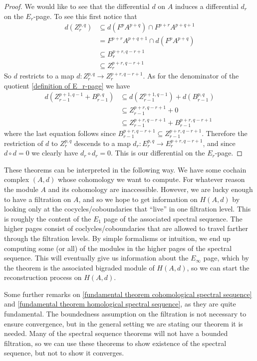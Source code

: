 \begin{proof}
We would like to see that the differential $d$ on $A$ induces a differential $d_r$ on the $E_r$-page. To see this first notice that
\begin{align*}
	d(Z_r^{p,q}) &\subseteq d(F^p A^{p+q}) \cap F^{p+r} A^{p+q+1} \\
						   &= F^{p+r} A^{p+q+1} \cap d(F^p A^{p+q}) \\
						   &\subseteq B_r^{p+r,q-r+1} \\
						   &\subseteq Z_r^{p+r,q-r+1} 
\end{align*}
So $d$ restricts to a map $d : Z_r^{p,q} \rightarrow Z_r^{p+r,q-r+1}$. As for the denominator of the quotient \ref{definition of E_r-page} we have
\begin{align*}
	d(Z_{r-1}^{p+1,q-1} + B_{r-1}^{p,q}) &\subseteq d(Z_{r-1}^{p+1,q-1}) + d(B_{r-1}^{p,q}) \\
	                                     &\subseteq Z_{r-1}^{p+r,q-r+1} + 0 \\
	                                     &\subseteq Z_{r-1}^{p+r,q-r+1} + B_{r-1}^{p+r,q-r+1}
\end{align*}
where the last equation follows since $B_{r-1}^{p+r,q-r+1} \subseteq Z_{r-1}^{p+r,q-r+1}$. Therefore the restriction of $d$ to $Z_r^{p,q}$ descends to a map $d_r : E_r^{p,q} \rightarrow E_r^{p+r,q-r+1}$, and since $d \circ d = 0$ we clearly have $d_r \circ d_r = 0$. This is our differential on the $E_r$-page.

\end{proof}

These theorems can be interpreted in the following way. We have some cochain complex $(A,d)$ whose cohomology we want to compute. For whatever reason the module $A$ and its cohomology are inaccessible. However, we are lucky enough to have a filtration on $A$, and so we hope to get information on $H(A,d)$ by looking only at the cocycles/coboundaries that ``live'' in one filtration level. This is roughly the content of the $E_1$ page of the associated spectral sequence. The higher pages consist of coclycles/coboundaries that are allowed to travel farther through the filtration levels. By simple formalisms or intuition, we end up computing some (or all) of the modules in the higher pages of the spectral sequence. This will eventually give us information about the $E_\infty$ page, which by the theorem is the associated bigraded module of $H(A,d)$, so we can start the reconstruction process on $H(A,d)$.

Some further remarks on \ref{fundamental theorem cohomological spectral sequence} and \ref{fundamental theorem homological spectral sequence}, as they are quite fundamental. The boundedness assumption on the filtration is not necessary to ensure convergence, but in the general setting we are stating our theorem it is needed. Many of the spectral sequence theorems will not have a bounded filtration, so we can use these theorems to show existence of the spectral sequence, but not to show it converges. 


